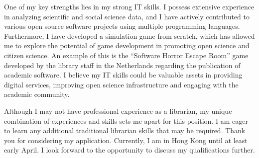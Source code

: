\documentclass[11pt, a4paper]{awesome-cv}
\begin{document}
\begin{cvletter}
One of my key strengths lies in my strong IT skills. I possess extensive experience in analyzing scientific and social science data, and I have actively contributed to various open source software projects using multiple programming languages. Furthermore, I have developed a simulation game from scratch, which has allowed me to explore the potential of game development in promoting open science and citizen science. An example of this is the ``Software Horror Escape Room'' game developed by the library staff in the Netherlands regarding the publication of academic software. I believe my IT skills could be valuable assets in providing digital services, improving open science infrastructure and engaging with the academic community.

Although I may not have professional experience as a librarian, my unique combination of experiences and skills sets me apart for this position. I am eager to learn any additional traditional librarian skills that may be required. Thank you for considering my application. Currently, I am in Hong Kong until at least early April. I look forward to the opportunity to discuss my qualifications further.


\end{cvletter}


\makeletterclosing
\end{document}
